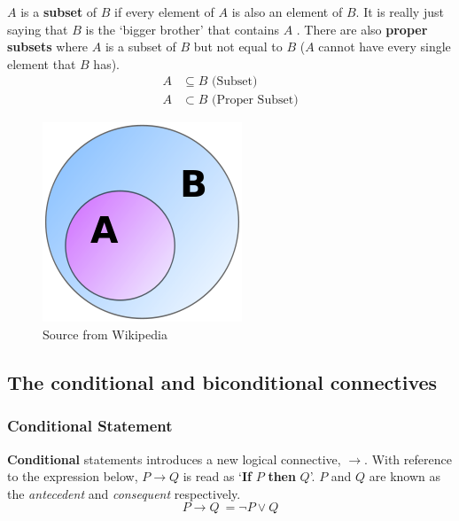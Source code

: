 \documentclass[../setup.tex]{subfiles}
\begin{document}
\begin{theorem}[Subset]
$A$ is a \textbf{subset} of $B$ if every element of $A$ is also an element of $B$. It is really just saying that $B$ is the `bigger brother' that contains $A$ . There are also \textbf{proper subsets} where $A$ is a subset of $B$ but not equal to $B$ ($A$ cannot have every single element that $B$ has).
\begin{align*}
A &\subseteq B \text{\ \ \ \ (Subset)} \\
A &\subset B \text{\ \ \ \ (Proper Subset)}
\end{align*}
\begin{figure}[H]
    \centering
    \includegraphics[scale=0.6]{Venn Diagram-ProperSubset.png}
    \caption{Source from Wikipedia}
\end{figure}
\end{theorem}

\subsection{The conditional and biconditional connectives}
\subsubsection{Conditional Statement}
\begin{theorem}
 \textbf{Conditional} statements introduces a new logical connective, $\rightarrow$. With reference to the expression below, $P\rightarrow Q$ is read as `\textbf{If} $P$ \textbf{then} $Q$'. $P$ and $Q$ are known as the \textit{antecedent} and \textit{consequent} respectively.
\[P\rightarrow Q\ = \lnot P \lor Q \]
\end{theorem}
\end{document}

